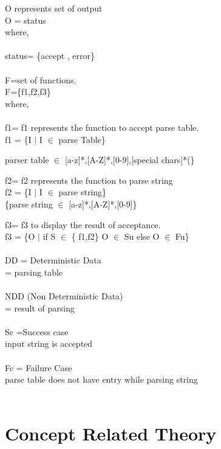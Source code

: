 \documentclass[12pt]{article}
\begin{document}
O represents set of output\\
O = status\\
where,\\\\ status= \{accept , error\}\\\\

F=set of functions.\\
F=\{f1,f2,f3\}\\
where,\\\\

f1= f1 represents the function to accept parse table.\\
f1 = \{I $\mid$ I $\in$ parse Table\}\\
{parser table $\in$ [a-z]*,[A-Z]*,[0-9],[special chars]*(\}

f2= f2 represents the function to parse string\\
f2 = \{I $\mid$ I $\in$ parse string\}\\
\{parse string $\in$ [a-z]*,[A-Z]*,[0-9]\}

f3= f3 to display the result of acceptance.\\
f3 = \{O $\mid$ if S $\in$ \{ f1,f2\} O $\in$ Su else O $\in$ Fu\}\\\\

DD = Deterministic Data\\
= parsing table\\\\

NDD (Non Deterministic Data)\\
= result of parsing\\\\

Sc =Success case\\ input string is accepted\\\\
Fc = Failure Case\\parse table does not have entry while parsing string\\\\

\section{Concept Related Theory}
}
\end{document}
